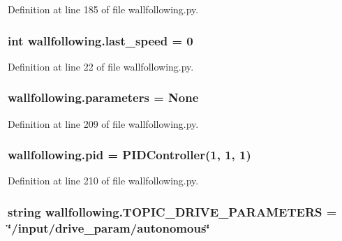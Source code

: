 Definition at line 185 of file wallfollowing.\+py.

\subsubsection[{\texorpdfstring{last\+\_\+speed}{last_speed}}]{\setlength{\rightskip}{0pt plus 5cm}int wallfollowing.\+last\+\_\+speed = 0}\hypertarget{namespacewallfollowing_a9ee8d77a4629b5d8ecb2899da6e3a7fe}{}\label{namespacewallfollowing_a9ee8d77a4629b5d8ecb2899da6e3a7fe}


Definition at line 22 of file wallfollowing.\+py.

\subsubsection[{\texorpdfstring{parameters}{parameters}}]{\setlength{\rightskip}{0pt plus 5cm}wallfollowing.\+parameters = None}\hypertarget{namespacewallfollowing_ae96254db0e391eed9862d0a6f636033e}{}\label{namespacewallfollowing_ae96254db0e391eed9862d0a6f636033e}


Definition at line 209 of file wallfollowing.\+py.

\subsubsection[{\texorpdfstring{pid}{pid}}]{\setlength{\rightskip}{0pt plus 5cm}wallfollowing.\+pid = {\bf P\+I\+D\+Controller}(1, 1, 1)}\hypertarget{namespacewallfollowing_adc9f95e0b626be8ddae98a596a38e7e8}{}\label{namespacewallfollowing_adc9f95e0b626be8ddae98a596a38e7e8}


Definition at line 210 of file wallfollowing.\+py.

\subsubsection[{\texorpdfstring{T\+O\+P\+I\+C\+\_\+\+D\+R\+I\+V\+E\+\_\+\+P\+A\+R\+A\+M\+E\+T\+E\+RS}{TOPIC_DRIVE_PARAMETERS}}]{\setlength{\rightskip}{0pt plus 5cm}string wallfollowing.\+T\+O\+P\+I\+C\+\_\+\+D\+R\+I\+V\+E\+\_\+\+P\+A\+R\+A\+M\+E\+T\+E\+RS = \char`\"{}/input/drive\+\_\+param/autonomous\char`\"{}}\hypertarget{namespacewallfollowing_a765ce45df7d0c3d9134fc83534029e36}{}\label{namespacewallfollowing_a765ce45df7d0c3d9134fc83534029e36}


